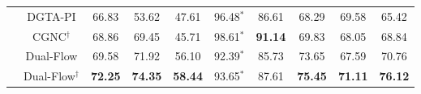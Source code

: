 \begin{table*}[h!]
{\begin{small}
\begin{sc}
\begin{tabular}{c|c|c|c|c|c|c|c|c|c}
             & DGTA-PI           & 66.83    & 53.62    & 47.61    & 96.48$^{*}$    & 86.61    & 68.29    & 69.58 & 65.42\\
             & CGNC$^{\dagger}$  & 68.86    & 69.45    & 45.71    & 98.61$^{*}$    & \textbf{91.14}    & 69.83    & 68.05 & 68.84\\
             & Dual-Flow             & 69.58 & 71.92 & 56.10 & 92.39$^{*}$ & 85.73 & 73.65 & 67.59 & 70.76\\
             & Dual-Flow$^{\dagger}$ & \textbf{72.25} & \textbf{74.35} & \textbf{58.44} & 93.65$^{*}$ & 87.61 & \textbf{75.45} & \textbf{71.11} & \textbf{76.12}\\
             \bottomrule
    \end{tabular}%

  \label{tab:single}%
  \end{sc}
  \end{small}}
  \vskip -0.1in
\end{table*}%
